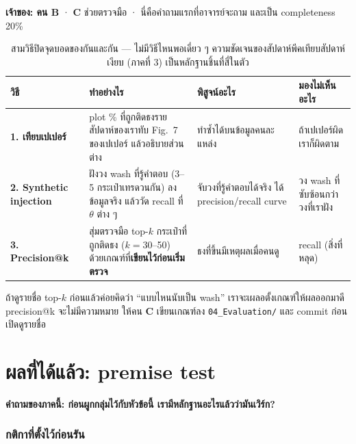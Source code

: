 \documentclass[11pt,a4paper]{article}
\newcommand{\sansall}{\sffamily}
\newcommand{\en}[1]{#1}
\newcommand{\code}[1]{\texttt{#1}}
\newcommand{\stg}[2]{\textcolor{#1}{\textbf{\en{#2}}}}
\newcommand{\rB}{\stg{alg}{B}}
\newcommand{\rC}{\stg{ext}{C}}
\newcommand{\thd}[1]{\sansall\bfseries #1}
\begin{document}
\textbf{เจ้าของ: คน \rB{}} · \rC{} ช่วยตรวจมือ · นี่คือคำถามแรกที่อาจารย์จะถาม และเป็น completeness 20\%

\begin{table}[H]
\centering\small
\begin{tabular}{L{3.0cm}L{4.8cm}L{3.4cm}L{3.2cm}}
\toprule
\thd{วิธี} & \thd{ทำอย่างไร} & \thd{พิสูจน์อะไร} & \thd{มองไม่เห็นอะไร} \\
\midrule
\textbf{1. เทียบเปเปอร์} & plot \% ที่ถูกติดธงรายสัปดาห์ของเราทับ Fig.~7 ของเปเปอร์ แล้วอธิบายส่วนต่าง &
  ทำซ้ำได้บนข้อมูลคนละแหล่ง & ถ้าเปเปอร์ผิด เราก็ผิดตาม \\
\addlinespace
\textbf{2. Synthetic injection} & ฝังวง wash ที่รู้คำตอบ (3--5 กระเป๋าเทรดวนกัน) ลงข้อมูลจริง
  แล้ววัด recall ที่ $\theta$ ต่าง ๆ & จับวงที่รู้คำตอบได้จริง ได้ precision/recall curve &
  วง wash ที่ซับซ้อนกว่าวงที่เราฝัง \\
\addlinespace
\textbf{3. Precision@k} & สุ่มตรวจมือ top-$k$ กระเป๋าที่ถูกติดธง ($k = 30$--50)
  ด้วยเกณฑ์ที่\textbf{เขียนไว้ก่อนเริ่มตรวจ} & ธงที่ขึ้นมีเหตุผลเมื่อคนดู &
  recall (สิ่งที่หลุด) \\
\bottomrule
\end{tabular}
\caption{สามวิธีปิดจุดบอดของกันและกัน --- ไม่มีวิธีไหนพอเดี่ยว ๆ
ความชัดเจนของสัปดาห์พีคเทียบสัปดาห์เงียบ (ภาคที่ 3) เป็นหลักฐานชิ้นที่สี่ในตัว}
\end{table}

\begin{badbox}[title={อย่าตั้งเกณฑ์ตรวจมือหลังจากเห็นผลแล้ว}]
ถ้าดูรายชื่อ top-$k$ ก่อนแล้วค่อยคิดว่า ``แบบไหนนับเป็น wash''
เราจะเผลอตั้งเกณฑ์ให้ผลออกมาดี precision@k จะไม่มีความหมาย
ให้คน \rC{} เขียนเกณฑ์ลง \code{04\_Evaluation/} และ commit ก่อนเปิดดูรายชื่อ
\end{badbox}

\clearpage
\part{ผลที่ได้แล้ว: premise test}

\textbf{คำถามของภาคนี้: ก่อนผูกกลุ่มไว้กับหัวข้อนี้ เรามีหลักฐานอะไรแล้วว่ามันเวิร์ก?}

\section{กติกาที่ตั้งไว้ก่อนรัน}
\end{document}
